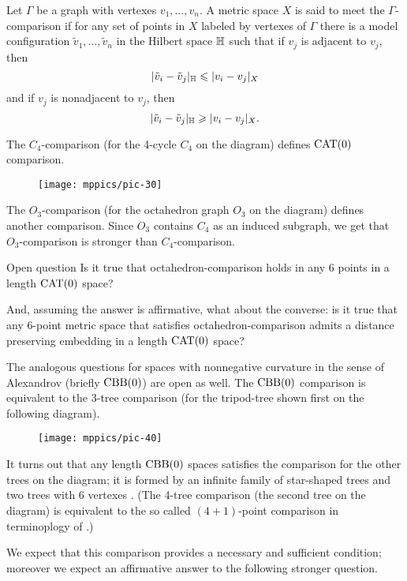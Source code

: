 \documentclass{article}
\begin{document}
Let $\Gamma$ be a graph with vertexes $v_1,\dots,v_n$.
A metric space $X$ is said to meet the $\Gamma$-comparison if for any set of points in $X$ labeled by vertexes of $\Gamma$ there is a model configuration $\tilde v_1,\dots,\tilde v_n$ in the Hilbert space $\mathbb H$ such that 
if $v_j$ is adjacent to $v_j$, then
\[|\tilde v_i-\tilde v_j|_{\mathbb H}\leqslant | v_i-v_j|_{X}\]
and
if $v_j$ is nonadjacent to $v_j$, then
\[|\tilde v_i-\tilde v_j|_{\mathbb H}\geqslant | v_i-v_j|_{X}.\]

The $C_4$-comparison (for the 4-cycle $C_4$ on the diagram) defines $\mathrm{CAT}(0)$ comparison.
\begin{figure}[h!]
\vskip-0mm
\centering
\texttt{[image: mppics/pic-30]}
\end{figure}
The $O_3$-comparison (for the octahedron graph $O_3$ on the diagram) defines another comparison.
Since $O_3$ contains $C_4$ as an induced subgraph, we get that $O_3$-comparison is stronger than $C_4$-comparison.

\begin{thm}{Open question}
Is it true that octahedron-comparison holds in any 6 points in a length $\mathrm{CAT}(0)$ space?

And, assuming the answer is affirmative, what about the converse: is it true that any 6-point metric space that satisfies octahedron-comparison admits a distance preserving embedding in a length $\mathrm{CAT}(0)$ space?
\end{thm}


The analogous questions for  spaces with nonnegative curvature in the sense of Alexandrov (briefly $\mathrm{CBB}(0)$) are open as well.
The $\mathrm{CBB}(0)$ comparison is equivalent to the $3$-tree comparison (for the tripod-tree shown first on the following diagram).
\begin{figure}[h!]
\vskip-0mm
\centering
\texttt{[image: mppics/pic-40]}
\end{figure}
It turns out that any length $\mathrm{CBB}(0)$ spaces satisfies the comparison for the other trees on the diagram; it is formed by an infinite family of star-shaped trees and two trees with 6 vertexes \cite{alexander-kapovitch-petrunin-2011,lebedeva-petrunin-zolotov}.
(The 4-tree comparison (the second tree on the diagram) is equivalent to the so called $(4{+}1)$-point comparison in terminoplogy of \cite{alexander-kapovitch-petrunin-2011}.)

We expect that this comparison provides a necessary and sufficient condition; moreover we expect an affirmative answer to the following stronger question.
\end{document}
